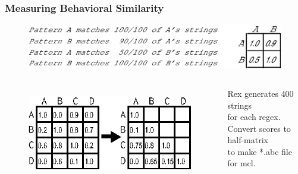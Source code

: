 \begin{frame}
\frametitle{Measuring Behavioral Similarity}
\begin{figure}[ht]
  \centering
  \includegraphics[scale=0.65]{nontex/illustrations/minimalMatrix.eps}
  \label{fig:minimalMatrix}
\end{figure}

\begin{columns}[t] %
\begin{figure}[h]
  \centering
  \includegraphics[scale=1]{nontex/illustrations/matrixToGraph.eps}
  \label{fig:matrixToGraph}
\end{figure}
\begin{center}
Rex generates 400 strings\\
for each regex.\\
Convert scores to half-matrix\\
to make *.abc file for mcl.
\end{center}
\end{columns}
\end{frame}



